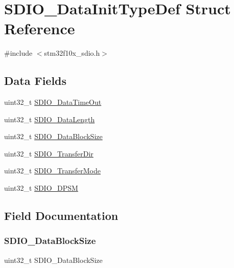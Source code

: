 \hypertarget{struct_s_d_i_o___data_init_type_def}{}\section{S\+D\+I\+O\+\_\+\+Data\+Init\+Type\+Def Struct Reference}
\label{struct_s_d_i_o___data_init_type_def}


{\ttfamily \#include $<$stm32f10x\+\_\+sdio.\+h$>$}

\subsection*{Data Fields}
\begin{DoxyCompactItemize}
\item 
uint32\+\_\+t \mbox{\hyperlink{struct_s_d_i_o___data_init_type_def_aa02f4539b152bbc3d94bb65a563d302c}{S\+D\+I\+O\+\_\+\+Data\+Time\+Out}}
\item 
uint32\+\_\+t \mbox{\hyperlink{struct_s_d_i_o___data_init_type_def_a027631b174bafc0a746bf62446487fc9}{S\+D\+I\+O\+\_\+\+Data\+Length}}
\item 
uint32\+\_\+t \mbox{\hyperlink{struct_s_d_i_o___data_init_type_def_aa8a9c16ad0145fb75373940f0dc93805}{S\+D\+I\+O\+\_\+\+Data\+Block\+Size}}
\item 
uint32\+\_\+t \mbox{\hyperlink{struct_s_d_i_o___data_init_type_def_a8e3f15e7eab553fd3be0419ad809c3de}{S\+D\+I\+O\+\_\+\+Transfer\+Dir}}
\item 
uint32\+\_\+t \mbox{\hyperlink{struct_s_d_i_o___data_init_type_def_ab5a77921227a04c3aeb383b794c2a64c}{S\+D\+I\+O\+\_\+\+Transfer\+Mode}}
\item 
uint32\+\_\+t \mbox{\hyperlink{struct_s_d_i_o___data_init_type_def_a3f78865ad5cf3c8d1747faeeb3280d7e}{S\+D\+I\+O\+\_\+\+D\+P\+SM}}
\end{DoxyCompactItemize}


\subsection{Field Documentation}
\mbox{\label{struct_s_d_i_o___data_init_type_def_aa8a9c16ad0145fb75373940f0dc93805}} 
\subsubsection{\texorpdfstring{SDIO\_DataBlockSize}{SDIO\_DataBlockSize}}
{\footnotesize\ttfamily uint32\+\_\+t S\+D\+I\+O\+\_\+\+Data\+Block\+Size}

